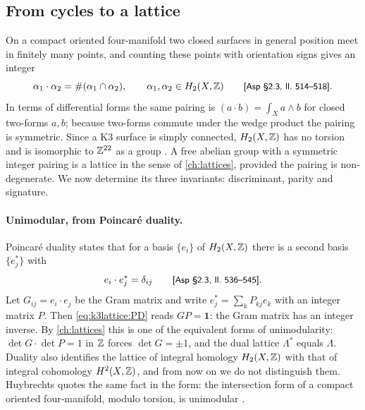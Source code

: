 \subsection{From cycles to a lattice}
On a compact oriented four-manifold two closed surfaces in general position meet in finitely
many points, and counting these points with orientation signs gives an integer
\begin{equation}\label{eq:k3lattice:intersection}
 \alpha_1\cdot\alpha_2=\#(\alpha_1\cap\alpha_2),\qquad \alpha_1,\alpha_2\in H_2(X,\mathbb{Z})
 \qquad\text{{\small\textsf{[Asp §2.3, ll.~514--518]}}} .
\end{equation}
In terms of differential forms the same pairing is $(a\cdot b)=\int_X a\wedge b$ for closed
two-forms $a,b$; because two-forms commute under the wedge product the pairing is symmetric.
Since a K3 surface is simply connected, $H_2(X,\mathbb{Z})$ has no torsion and is isomorphic to
$\mathbb{Z}^{22}$ as a group . A free abelian group
with a symmetric integer pairing is a lattice in the sense of
\cref{ch:lattices}, provided the pairing is non-degenerate. We now determine its three
invariants: discriminant, parity and signature.

\paragraph{Unimodular, from Poincaré duality.}
Poincaré duality states that for a basis $\{e_i\}$ of $H_2(X,\mathbb{Z})$ there is a second basis
$\{e_j^*\}$ with
\begin{equation}\label{eq:k3lattice:PD}
 e_i\cdot e_j^*=\delta_{ij}\qquad\text{{\small\textsf{[Asp §2.3, ll.~536--545]}}} .
\end{equation}
Let $G_{ij}=e_i\cdot e_j$ be the Gram matrix and write $e_j^*=\sum_kP_{kj}e_k$ with an integer
matrix $P$. Then \eqref{eq:k3lattice:PD} reads $GP=\mathbf 1$: the Gram matrix has an integer
inverse. By \cref{ch:lattices} this is one of the equivalent forms of
unimodularity: $\det G\cdot\det P=1$ in $\mathbb{Z}$ forces $\det G=\pm1$,
and the dual lattice $\Lambda^*$ equals $\Lambda$. Duality also identifies the lattice of
integral homology $H_2(X,\mathbb{Z})$ with that of integral cohomology $H^2(X,\mathbb{Z})$, and from now on
we do not distinguish them. Huybrechts quotes the same fact in the form: the intersection
form of a compact oriented four-manifold, modulo torsion, is unimodular
.

